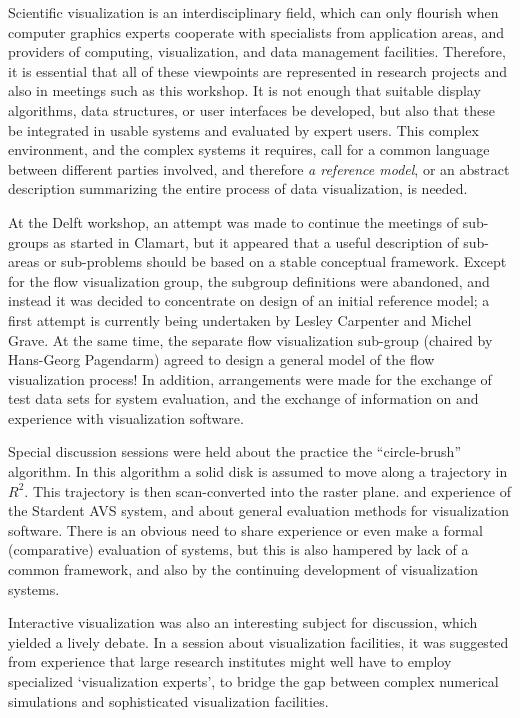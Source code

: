 \documentclass{egpubl}
\begin{document}
Scientific visualization is an interdisciplinary field, which can only
flourish when computer graphics experts cooperate with specialists from
application areas, and providers of computing, visualization, and data
management facilities. Therefore, it is essential that all of these
viewpoints are represented in research projects and also in meetings such as
this workshop. It is not enough that suitable display algorithms, data
structures, or user interfaces be developed, but also that these be
integrated in usable systems and evaluated by expert users. This complex
environment, and the complex systems it requires, call for a common language
between different parties involved, and therefore \emph{a reference model}, or
an abstract description summarizing the entire process of data visualization,
is needed.

At the Delft workshop, an attempt was made to continue the meetings of
sub-groups as started in Clamart\cite{yll}, but it appeared that a useful
description of sub-areas or sub-problems should be based on a stable
conceptual framework. Except for the flow visualization group, the subgroup
definitions were abandoned, and instead it was decided to concentrate on
design of an initial reference model; a first attempt is currently being
undertaken by Lesley Carpenter and Michel Grave. At the same time, the
separate flow visualization sub-group (chaired by Hans-Georg Pagendarm)
agreed to design a general model of the flow visualization process! In
addition, arrangements were made for the exchange of test data sets for
system evaluation, and the exchange of information on and experience with
visualization software.

Special discussion sessions were held about the practice the ``circle-brush''
algorithm. In this algorithm a solid disk is assumed to move along a
trajectory in $R^2$. This trajectory is then scan-converted into the raster
plane. and experience of the Stardent AVS system, and about general
evaluation methods for visualization software. There is an obvious need to
share experience or even make a formal (comparative) evaluation of systems,
but this is also hampered by lack of a common framework, and also by the
continuing development of visualization systems.

Interactive visualization was also an interesting subject for discussion,
which yielded a lively debate\cite{yll}. In a session about visualization
facilities, it was suggested from experience that large research institutes
might well have to employ specialized `visualization experts', to bridge the
gap between complex numerical simulations and sophisticated visualization
facilities.
\end{document}

